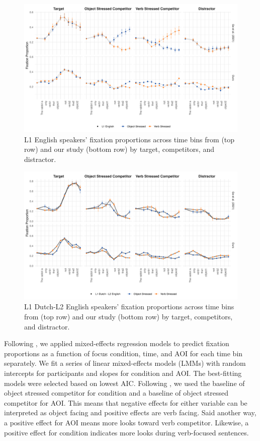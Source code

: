 \begin{figure}[H]  %
    \centering
    \includegraphics[width=\textwidth,height=\textheight,keepaspectratio]{viz/english_fix.png}
    \caption{L1 English speakers' fixation proportions across time bins from \cite{ge2021a} (top row) and our study (bottom row) by target, competitors, and distractor.}
    \label{fig:english_fix}
\end{figure}

\begin{figure}  %
    \centering
    \includegraphics[width=\textwidth,height=\textheight,keepaspectratio]{viz/dutch_fix.png}
    \caption{L1 Dutch-L2 English speakers' fixation proportions across time bins from \cite{ge2021a} (top row) and our study (bottom row) by target, competitors, and distractor.}
    \label{fig:dutch_fix}
\end{figure}

Following \cite{ge2021a}, we applied mixed-effects regression models to predict fixation proportions as a function of focus condition, time, and AOI for each time bin separately. We fit a series of linear mixed-effects models (LMMs) with random intercepts for participants and slopes for condition and AOI. The best-fitting models were selected based on lowest AIC. Following \cite{ge2021a}, we used the baseline of object stressed competitor for condition and a baseline of object stressed competitor for AOI. This means that negative effects for either variable can be interpreted as object facing and positive effects are verb facing. Said another way, a positive effect for AOI means more looks toward verb competitor. Likewise, a positive effect for condition indicates more looks during verb-focused sentences.

